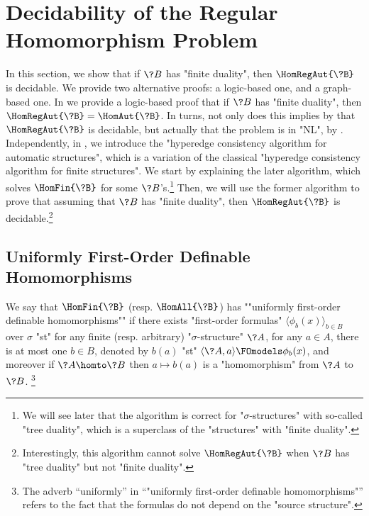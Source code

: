\section{Decidability of the Regular Homomorphism Problem}
\label{sec:dichotomy-decidability}

In this section, we show that if $\?B$ has "finite duality", then $\HomRegAut{\?B}$ is decidable.
We provide two alternative proofs: a logic-based one, and a graph-based one.
In  we provide
a logic-based proof that if $\?B$ has "finite duality", then $\HomRegAut{\?B} = \HomAut{\?B}$.
In turns, not only does this implies by 
that $\HomRegAut{\?B}$ is decidable, but actually that the problem is in "NL",
by .
Independently, in ,
we introduce the "hyperedge consistency algorithm for automatic structures",
which is a variation of the classical "hyperedge consistency algorithm for finite structures".
We start by explaining the later algorithm,
which solves $\HomFin{\?B}$ for some $\?B$'s.\footnote{We will
see later that the algorithm is correct for "$\sigma$-structures" with so-called "tree duality",
which is a superclass of the "structures" with "finite duality".}
Then, we will use the former algorithm to prove that assuming that $\?B$ has "finite duality",
then $\HomRegAut{\?B}$ is decidable.\footnote{Interestingly, this algorithm cannot solve
$\HomRegAut{\?B}$ when $\?B$ has "tree duality" but not "finite duality".}

\subsection{Uniformly First-Order Definable Homomorphisms}
\label{sec:uniformly-first-order-definable-hom}

We say that $\HomFin{\?B}$ (resp. $\HomAll{\?B}$)
has \AP""uniformly first-order definable homomorphisms"" if there exists "first-order formulas"
$\langle \phi_b(x) \rangle_{b\in B}$ over $\sigma$ "st" for any finite
(resp. arbitrary) "$\sigma$-structure" $\?A$, for any $a\in A$,
there is at most one $b \in B$, denoted by $b(a)$
"st" $\langle \?A, a \rangle \FOmodels \phi_b(x)$, and moreover if $\?A \homto \?B$
then $a \mapsto b(a)$ is a "homomorphism" from $\?A$ to $\?B$.%
\footnote{The adverb ``uniformly'' in ``"uniformly first-order definable homomorphisms"''
refers to the fact that the formulas do not depend on the "source structure".}

